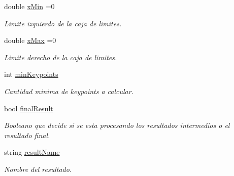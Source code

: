 \begin{DoxyCompactItemize}
\mbox{\label{classuav_1_1Stitcher_a26ca9f2ae4842f0d380f95d792c0c7ba}} 
double \mbox{\hyperlink{classuav_1_1Stitcher_a26ca9f2ae4842f0d380f95d792c0c7ba}{x\+Min}} =0
\begin{DoxyCompactList}\small\item\em Limite izquierdo de la caja de limites. \end{DoxyCompactList}\item 
\mbox{\label{classuav_1_1Stitcher_a20838e1362253194087dad4602a2fd94}} 
double \mbox{\hyperlink{classuav_1_1Stitcher_a20838e1362253194087dad4602a2fd94}{x\+Max}} =0
\begin{DoxyCompactList}\small\item\em Limite derecho de la caja de limites. \end{DoxyCompactList}\item 
\mbox{\label{classuav_1_1Stitcher_a3b54e9be9bda44c4a04b14a645bd9521}} 
int \mbox{\hyperlink{classuav_1_1Stitcher_a3b54e9be9bda44c4a04b14a645bd9521}{min\+Keypoints}}
\begin{DoxyCompactList}\small\item\em Cantidad minima de keypoints a calcular. \end{DoxyCompactList}\item 
\mbox{\label{classuav_1_1Stitcher_af9e17d1709ac39044b31555d75b9bb54}} 
bool \mbox{\hyperlink{classuav_1_1Stitcher_af9e17d1709ac39044b31555d75b9bb54}{final\+Result}}
\begin{DoxyCompactList}\small\item\em Booleano que decide si se esta procesando los resultados intermedios o el resultado final. \end{DoxyCompactList}\item 
\mbox{\label{classuav_1_1Stitcher_a910ff14cc80b37beb8598894c535d00f}} 
string \mbox{\hyperlink{classuav_1_1Stitcher_a910ff14cc80b37beb8598894c535d00f}{result\+Name}}
\begin{DoxyCompactList}\small\item\em Nombre del resultado. \end{DoxyCompactList}\item 
\mbox{\label{classuav_1_1Stitcher_af0c6f4217fb85386b4af03330997d960}} 

\end{DoxyCompactItemize}
